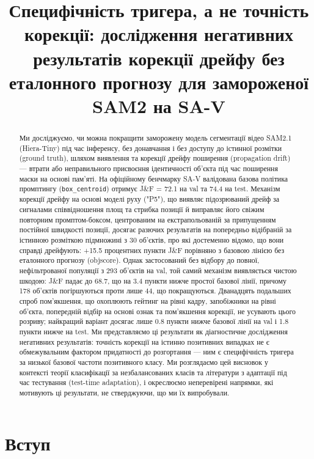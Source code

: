 \documentclass[11pt]{article}
\title{Специфічність тригера, а не точність корекції: дослідження негативних результатів корекції дрейфу без еталонного прогнозу для замороженої SAM2 на SA-V}
\author{}
\date{}
\begin{document}
\maketitle

\begin{abstract}
Ми досліджуємо, чи можна покращити заморожену модель сегментації відео SAM2.1 (Hiera-Tiny) під час інференсу, без донавчання і без доступу до істинної розмітки (ground truth), шляхом виявлення та корекції дрейфу поширення (propagation drift) --- втрати або неправильного присвоєння ідентичності об'єкта під час поширення маски на основі пам'яті. На офіційному бенчмарку SA-V валідована базова політика промптингу (\texttt{box\_centroid}) отримує J\&F = 72.1 на val та 74.4 на test. Механізм корекції дрейфу на основі моделі руху ("P5"), що виявляє підозрюваний дрейф за сигналами співвідношення площ та стрибка позиції й виправляє його свіжим повторним промптом-боксом, центрованим на екстрапольованій за припущенням постійної швидкості позиції, досягає разючих результатів на попередньо відібраній за істинною розміткою підмножині з 30 об'єктів, про які достеменно відомо, що вони справді дрейфують: +15.5 процентних пункти J\&F порівняно з базовою лінією без еталонного прогнозу (objscore). Однак застосований без відбору до повної, нефільтрованої популяції з 293 об'єктів на val, той самий механізм виявляється чистою шкодою: J\&F падає до 68.7, що на 3.4 пункти нижче простої базової лінії, причому 178 об'єктів погіршуються проти лише 44, що покращуються. Дванадцять подальших спроб пом'якшення, що охоплюють гейтинг на рівні кадру, запобіжники на рівні об'єкта, попередній відбір на основі ознак та пом'якшення корекції, не усувають цього розриву; найкращий варіант досягає лише 0.8 пункти нижче базової лінії на val і 1.8 пункти нижче на test. Ми представляємо ці результати як діагностичне дослідження негативних результатів: точність корекції на істинно позитивних випадках не є обмежувальним фактором придатності до розгортання --- ним є специфічність тригера за низької базової частоти позитивного класу. Ми розглядаємо цей висновок у контексті теорії класифікації за незбалансованих класів та літератури з адаптації під час тестування (test-time adaptation), і окреслюємо неперевірені напрямки, які мотивують ці результати, не стверджуючи, що ми їх випробували.
\end{abstract}

\section{Вступ}
\end{document}
